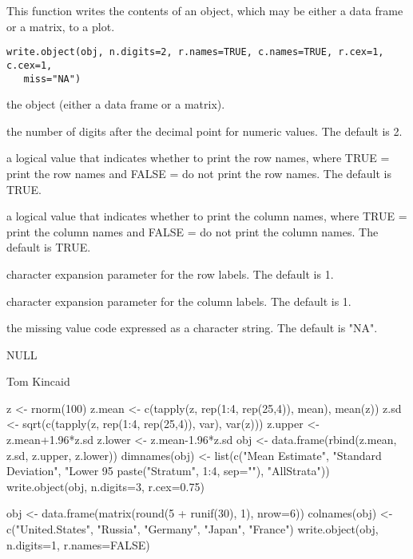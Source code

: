 \begin{Description}\relax
This function writes the contents of an object, which may be either a data frame
or a matrix, to a plot.
\end{Description}
\begin{Usage}
\begin{verbatim}
write.object(obj, n.digits=2, r.names=TRUE, c.names=TRUE, r.cex=1, c.cex=1,
   miss="NA")
\end{verbatim}
\end{Usage}
\begin{Arguments}
\begin{ldescription}
\item[\code{obj}] the object (either a data frame or a matrix).
\item[\code{n.digits}] the number of digits after the decimal point for numeric
values.  The default is 2.
\item[\code{r.names}] a logical value that indicates whether to print the row names,
where TRUE = print the row names and  FALSE = do not print the row names.
The default is TRUE.
\item[\code{c.names}] a logical value that indicates whether to print the column
names, where TRUE = print the column names and  FALSE = do not print the
column names.  The default is TRUE.
\item[\code{r.cex}] character expansion parameter for the row labels.  The default is
1.
\item[\code{c.cex}] character expansion parameter for the column labels.  The default
is 1.
\item[\code{miss}] the missing value code expressed as a character string.  The
default is "NA".
\end{ldescription}
\end{Arguments}
\begin{Value}
NULL
\end{Value}
\begin{Author}\relax
Tom Kincaid 
\end{Author}
\begin{Examples}
\begin{ExampleCode}
z <- rnorm(100)
z.mean <- c(tapply(z, rep(1:4, rep(25,4)), mean), mean(z))
z.sd <- sqrt(c(tapply(z, rep(1:4, rep(25,4)), var), var(z)))
z.upper <- z.mean+1.96*z.sd
z.lower <- z.mean-1.96*z.sd
obj <- data.frame(rbind(z.mean, z.sd, z.upper, z.lower))
dimnames(obj) <- list(c("Mean Estimate", "Standard Deviation",
  "Lower 95%
  paste("Stratum", 1:4, sep=""), "AllStrata"))
write.object(obj, n.digits=3, r.cex=0.75)

obj <- data.frame(matrix(round(5 + runif(30), 1), nrow=6))
colnames(obj) <- c("United.States", "Russia", "Germany",
  "Japan", "France")
write.object(obj, n.digits=1, r.names=FALSE)
\end{ExampleCode}
\end{Examples}

